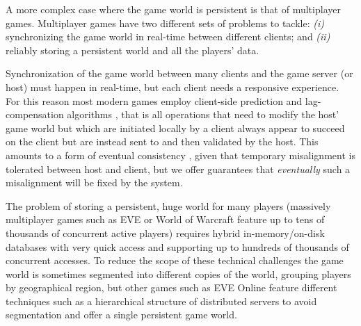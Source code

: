 A more complex case where the game world is persistent is that of multiplayer games. Multiplayer games have two different sets of problems to tackle: \textit{(i)} synchronizing the game world in real-time between different clients; and \textit{(ii)} reliably storing a persistent world and all the players’ data.

Synchronization of the game world between many clients and the game server (or host) must happen in real-time, but each client needs a responsive experience. For this reason most modern games employ client-side prediction and lag-compensation algorithms \cite{APPENDIX_B_LATENCY_COMPENSATION}, that is all operations that need to modify the host’ game world but which are initiated locally by a client always appear to succeed on the client but are instead sent to and then validated by the host. This amounts to a form of eventual consistency \cite{APPENDIX_B_EVENTUAL_CONSISTENCY}, given that temporary misalignment is tolerated between host and client, but we offer guarantees that \textit{eventually} such a misalignment will be fixed by the system.

The problem of storing a persistent, huge world for many players (massively multiplayer games such as EVE or World of Warcraft feature up to tens of thousands of concurrent active players) requires hybrid in-memory/on-disk databases with very quick access and supporting up to hundreds of thousands of concurrent accesses. To reduce the scope of these technical challenges the game world is sometimes segmented into different copies of the world, grouping players by geographical region, but other games such as EVE Online feature different techniques such as a hierarchical structure of distributed servers to avoid segmentation and offer a single persistent game world.


